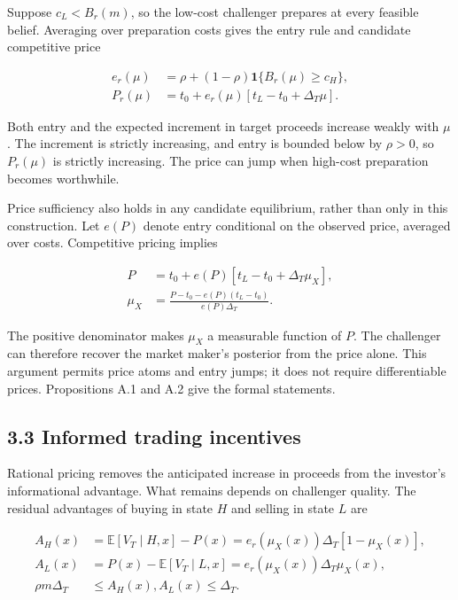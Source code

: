 \documentclass[
  12pt,
]{article}
\begin{document}
Suppose \(c_L<B_r(m)\), so the low-cost challenger prepares at every
feasible belief. Averaging over preparation costs gives the entry rule
and candidate competitive price

\[
\begin{aligned}
e_r(\mu)&=\rho+(1-\rho)\mathbf1\{B_r(\mu)\ge c_H\},\\
P_r(\mu)&=t_0+e_r(\mu)[t_L-t_0+\Delta_T\mu].
\end{aligned}
\tag{9}\label{eq:paper-9}
\]

Both entry and the expected increment in target proceeds increase weakly
with \(\mu\). The increment is strictly increasing, and entry is bounded
below by \(\rho>0\), so \(P_r(\mu)\) is strictly increasing. The price
can jump when high-cost preparation becomes worthwhile.

Price sufficiency also holds in any candidate equilibrium, rather than
only in this construction. Let \(e(P)\) denote entry conditional on the
observed price, averaged over costs. Competitive pricing implies

\[
\begin{aligned}
P&=t_0+e(P)[t_L-t_0+\Delta_T\mu_X],\\
\mu_X&=\frac{P-t_0-e(P)(t_L-t_0)}{e(P)\Delta_T}.
\end{aligned}
\tag{10}\label{eq:paper-10}
\]

The positive denominator makes \(\mu_X\) a measurable function of \(P\).
The challenger can therefore recover the market maker's posterior from
the price alone. This argument permits price atoms and entry jumps; it
does not require differentiable prices. Propositions A.1 and A.2 give
the formal statements.

\subsection{3.3 Informed trading
incentives}\label{sec-informed-trading-incentives}

Rational pricing removes the anticipated increase in proceeds from the
investor's informational advantage. What remains depends on challenger
quality. The residual advantages of buying in state \(H\) and selling in
state \(L\) are

\[
\begin{aligned}
A_H(x)&=\mathbb E[V_T\mid H,x]-P(x)=e_r(\mu_X(x))\Delta_T[1-\mu_X(x)],\\
A_L(x)&=P(x)-\mathbb E[V_T\mid L,x]=e_r(\mu_X(x))\Delta_T\mu_X(x),\\
\rho m\Delta_T&\le A_H(x),A_L(x)\le\Delta_T.
\end{aligned}
\tag{11}\label{eq:paper-11}
\]
\end{document}
